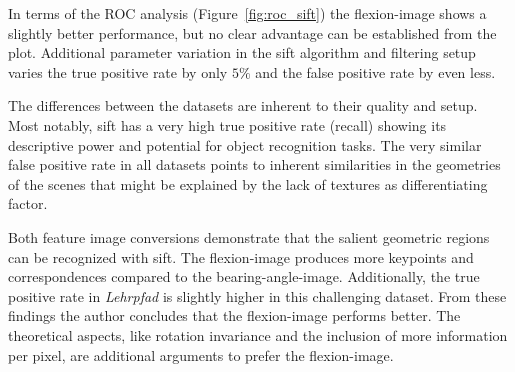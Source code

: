 In terms of the \acrshort{ROC} analysis (Figure~\ref{fig:roc_sift}) the \gls{flexion-image} shows a slightly better performance, but no clear advantage can be established from the plot.
Additional parameter variation in the \acrshort{sift} algorithm and filtering setup varies the true positive rate by only $5\%$ and the false positive rate by even less.

The differences between the datasets are inherent to their quality and setup.
Most notably, \acrshort{sift} has a very high true positive rate (recall) showing its descriptive power and potential for object recognition tasks.
The very similar false positive rate in all datasets points to inherent similarities in the geometries of the scenes that might be explained by the lack of textures as differentiating factor.

Both feature image conversions demonstrate that the salient geometric regions can be recognized with \acrshort{sift}.
The \gls{flexion-image} produces more keypoints and correspondences compared to the \gls{bearing-angle-image}.
Additionally, the true positive rate in \emph{Lehrpfad} is slightly higher in this challenging dataset.
From these findings the author concludes that the \gls{flexion-image} performs better.
The theoretical aspects, like rotation invariance and the inclusion of more information per pixel, are additional arguments to prefer the \gls{flexion-image}.

